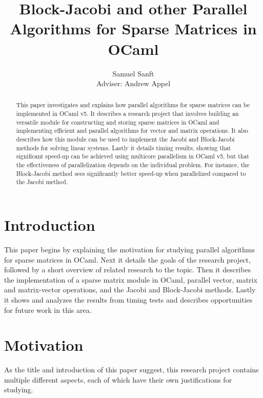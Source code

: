 \documentclass[pageno]{jpaper}
\begin{document}
\title{
Block-Jacobi and other Parallel Algorithms for Sparse Matrices in OCaml
}
\author{Samuel Sanft\\Adviser: Andrew Appel}
\date{}
\maketitle

\begin{doublespacing}

\begin{abstract}
This paper investigates and explains how parallel algorithms for sparse matrices can be implemented in OCaml v5. It describes a research project that involves building an versatile module for constructing and storing sparse matrices in OCaml and implementing efficient and parallel algorithms for vector and matrix operations. It also describes how this module can be used to implement the Jacobi and Block-Jacobi methods for solving linear systems. Lastly it details timing results, showing that significant speed-up can be achieved using multicore parallelism in OCaml v5, but that the effectiveness of parallelization depends on the individual problem. For instance, the Block-Jacobi method sees significantly better speed-up when parallelized compared to the Jacobi method.
\end{abstract}

\section{Introduction}
This paper begins by explaining the motivation for studying parallel algorithms for sparse matrices in OCaml. Next it details the goals of the research project, followed by a short overview of related research to the topic. Then it describes the implementation of a sparse matrix module in OCaml, parallel vector, matrix and matrix-vector operations, and the Jacobi and Block-Jacobi methods. Lastly it shows and analyzes the results from timing tests and describes opportunities for future work in this area.

\section{Motivation}
As the title and introduction of this paper suggest, this research project contains multiple different aspects, each of which have their own justifications for studying.


\end{doublespacing}
\end{document}
